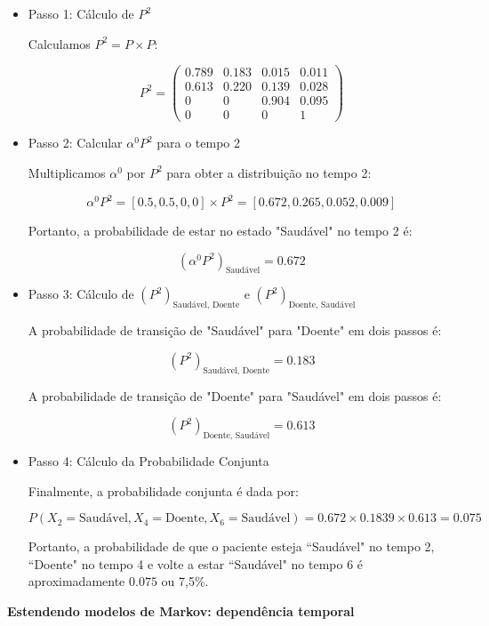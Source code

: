 \documentclass[12pt]{article}
\theoremstyle{break}
\begin{document}
\begin{itemize}
\item Passo 1: Cálculo de \( P^2 \)

Calculamos \( P^2 = P \times P \):

\[
P^2 = \begin{pmatrix}
    0.789 & 0.183 & 0.015 & 0.011 \\
    0.613 & 0.220 & 0.139 & 0.028 \\
    0 & 0 &0.904 & 0.095 \\
    0 & 0 & 0 & 1
\end{pmatrix}
\]

\item Passo 2: Calcular \( \alpha^0 P^2 \) para o tempo 2

Multiplicamos \( \alpha^0 \) por \( P^2 \) para obter a distribuição no tempo 2:

\[
\alpha^0 P^2 = [0.5, 0.5, 0, 0] \times P^2 = [0.672, 0.265,0.052,   0.009]
\]

Portanto, a probabilidade de estar no estado "Saudável" no tempo 2 é:

\[
(\alpha^0 P^2)_{\text{Saudável}} = 0.672
\]

\item Passo 3: Cálculo de \( (P^2)_{\text{Saudável, Doente}} \) e \( (P^2)_{\text{Doente, Saudável}} \)

A probabilidade de transição de "Saudável" para "Doente" em dois passos é:

\[
(P^2)_{\text{Saudável, Doente}} = 0.183
\]

A probabilidade de transição de "Doente" para "Saudável" em dois passos é:

\[
(P^2)_{\text{Doente, Saudável}} = 0.613
\]

\item Passo 4: Cálculo da Probabilidade Conjunta

Finalmente, a probabilidade conjunta é dada por:

\[
P(X_2 = \text{Saudável}, X_4 = \text{Doente}, X_6 = \text{Saudável}) = 0.672 \times 0.1839 \times 0.613 = 0.075
\]

Portanto, a probabilidade de que o paciente esteja ``Saudável" no tempo 2, ``Doente" no tempo 4 e volte a estar ``Saudável" no tempo 6 é aproximadamente \( 0.075 \) ou 7,5\%.

\end{itemize}




\textbf{Estendendo modelos de Markov: dependência temporal}
\end{document}
